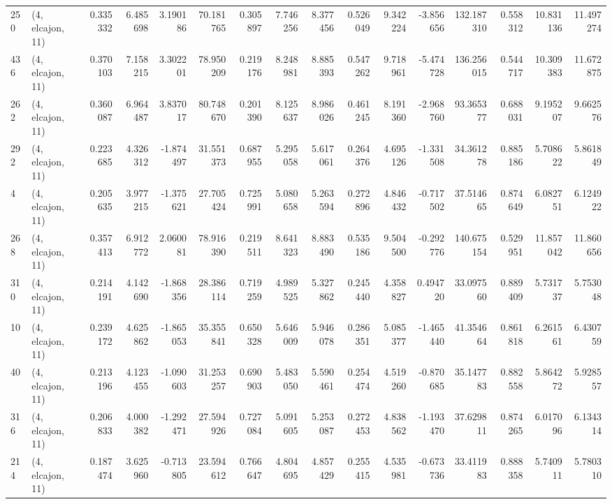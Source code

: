 \begin{tabular}{llrrrrrrrrrrrrrr}
250 &  (4, elcajon, 11) &   0.335332 &   6.485698 &   3.190186 &    70.181765 &   0.305897 &   7.746256 &   8.377456 &  0.526049 &   9.342224 &  -3.856656 &   132.187310 &  0.558312 &  10.831136 &  11.497274 \\
436 &  (4, elcajon, 11) &   0.370103 &   7.158215 &   3.302201 &    78.950209 &   0.219176 &   8.248981 &   8.885393 &  0.547262 &   9.718961 &  -5.474728 &   136.256015 &  0.544717 &  10.309383 &  11.672875 \\
262 &  (4, elcajon, 11) &   0.360087 &   6.964487 &   3.837017 &    80.748670 &   0.201390 &   8.125637 &   8.986026 &  0.461245 &   8.191360 &  -2.968760 &    93.365377 &  0.688031 &   9.195207 &   9.662576 \\
292 &  (4, elcajon, 11) &   0.223685 &   4.326312 &  -1.874497 &    31.551373 &   0.687955 &   5.295058 &   5.617061 &  0.264376 &   4.695126 &  -1.331508 &    34.361278 &  0.885186 &   5.708622 &   5.861849 \\
4   &  (4, elcajon, 11) &   0.205635 &   3.977215 &  -1.375621 &    27.705424 &   0.725991 &   5.080658 &   5.263594 &  0.272896 &   4.846432 &  -0.717502 &    37.514665 &  0.874649 &   6.082751 &   6.124922 \\
268 &  (4, elcajon, 11) &   0.357413 &   6.912772 &   2.060081 &    78.916390 &   0.219511 &   8.641323 &   8.883490 &  0.535186 &   9.504500 &  -0.292776 &   140.675154 &  0.529951 &  11.857042 &  11.860656 \\
310 &  (4, elcajon, 11) &   0.214191 &   4.142690 &  -1.868356 &    28.386114 &   0.719259 &   4.989525 &   5.327862 &  0.245440 &   4.358827 &   0.494720 &    33.097560 &  0.889409 &   5.731737 &   5.753048 \\
10  &  (4, elcajon, 11) &   0.239172 &   4.625862 &  -1.865053 &    35.355841 &   0.650328 &   5.646009 &   5.946078 &  0.286351 &   5.085377 &  -1.465440 &    41.354664 &  0.861818 &   6.261561 &   6.430759 \\
40  &  (4, elcajon, 11) &   0.213196 &   4.123455 &  -1.090603 &    31.253257 &   0.690903 &   5.483050 &   5.590461 &  0.254474 &   4.519260 &  -0.870685 &    35.147783 &  0.882558 &   5.864272 &   5.928557 \\
316 &  (4, elcajon, 11) &   0.206833 &   4.000382 &  -1.292471 &    27.594926 &   0.727084 &   5.091605 &   5.253087 &  0.272453 &   4.838562 &  -1.193470 &    37.629811 &  0.874265 &   6.017096 &   6.134314 \\
214 &  (4, elcajon, 11) &   0.187474 &   3.625960 &  -0.713805 &    23.594612 &   0.766647 &   4.804695 &   4.857429 &  0.255415 &   4.535981 &  -0.673736 &    33.411983 &  0.888358 &   5.740911 &   5.780310 \\

\end{tabular}
